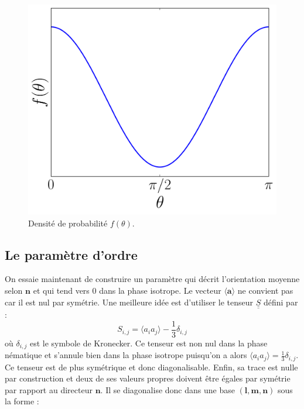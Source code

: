 \documentclass[11pt]{article}
\numberwithin{equation}{section}
\begin{document}
\begin{figure}[h!]
    \centering	    
	\includegraphics[scale=0.4]{figures/distrib.pdf}
    \caption{Densité de probabilité $f(\theta)$.}
    	\label{distrib} 
\end{figure}

\newpage

\subsection{Le paramètre d'ordre}
On essaie maintenant de construire un paramètre qui décrit l'orientation moyenne selon $\bm{n}$ et qui tend vers 0 dans la phase isotrope. Le vecteur $\langle \bm{a} \rangle $ ne convient pas car il est nul par symétrie. Une meilleure idée est d'utiliser le tenseur $\underline{\underline{S}}$ défini par :
\begin{equation}
S_{i,j} = \langle a_i a_j \rangle -\frac{1}{3} \delta_{i,j}
\label{tenseur}
\end{equation}
où $\delta_{i,j}$ est le symbole de Kronecker. Ce tenseur est non nul dans la phase nématique et s'annule bien dans la phase isotrope puisqu'on a alors $\langle  a_i a_j \rangle  = \frac{1}{3} \delta_{i,j}$. Ce tenseur est de plus symétrique et donc diagonalisable. Enfin, sa trace est nulle par construction et deux de ses valeurs propres doivent être égales par symétrie par rapport au directeur $\bm{n}$. Il se diagonalise donc dans une base $(\bm{l}, \bm{m}, \bm{n})$ sous la forme :
\end{document}
